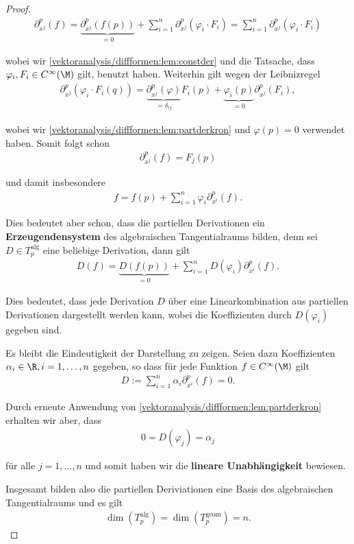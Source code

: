 \documentclass[letterpaper,10pt,english]{jupyterBook}
\begin{document}
\begin{proof}
\begin{align*}
\partial_{x^j}^p (f) = 
\underbrace{\partial_{x^j}^p (f(p))}_{=0} + 
\sum_{i=1}^{n} \partial_{x^j}^p(\varphi_i \cdot F_i) = 
\sum_{i=1}^{n} \partial_{x^j}^p(\varphi_i \cdot F_i)
\end{align*}
\par
wobei wir \cref{vektoranalysis/diffformen:lem:constder} und die Tatsache, dass \(\varphi_i, F_i\in C^\infty(\M)\) gilt, benutzt haben.
Weiterhin gilt wegen der Leibnizregel
\begin{align*}
\partial_{x^j}^p(\varphi_i \cdot F_i(q)) = 
\underbrace{\partial_{x^j}^p(\varphi)}_{=\delta_{ij}} F_i(p)+ \underbrace{\varphi_i(p)}_{=0} \partial_{x^j}^p(F_i),
\end{align*}
\par
wobei wir \cref{vektoranalysis/diffformen:lem:partderkron} und \(\varphi(p)=0\) verwendet haben.
Somit folgt schon
\begin{align*}
\partial_{x^j}^p (f) = F_j(p)
\end{align*}
\par
und damit insbesondere
\begin{align*}
f = f(p) + \sum_{i=1}^{n} \varphi_i \partial_{x^i}^p(f).
\end{align*}
\par
Dies bedeutet aber schon, dass die partiellen Derivationen ein \textbf{Erzeugendensystem} des algebraischen Tangentialraums bilden, denn sei \(D\in T^{\text{alg}}_p\) eine beliebige Derivation, dann gilt
\begin{align*}
D(f) = \underbrace{D(f(p))}_{=0} + \sum_{i=1}^n D(\varphi_i) \partial_{x^i}^p(f).
\end{align*}
\par
Dies bedeutet, dass jede Derivation \(D\) über eine Linearkombination aus partiellen Derivationen dargestellt werden kann, wobei die Koeffizienten durch \(D(\varphi_i)\) gegeben sind.

\par
Es bleibt die Eindeutigkeit der Darstellung zu zeigen.
Seien dazu Koeffizienten \(\alpha_i \in \R, i=1,\ldots,n\) gegeben, so dass für jede Funktion \(f\in C^\infty(\M)\) gilt
\begin{align*}
D:= \sum_{i=1}^n \alpha_i \partial_{x^i}^p(f) = 0.
\end{align*}
\par
Durch erneute Anwendung von \cref{vektoranalysis/diffformen:lem:partderkron} erhalten wir aber, dass
\begin{align*}
0 = D(\varphi_j) = \alpha_j\end{align*}
\par
für alle \(j=1,\ldots,n\) und somit haben wir die \textbf{lineare Unabhängigkeit} bewiesen.

\par
Insgesamt bilden also die partiellen Deriviationen eine Basis des algebraischen Tangentialraums und es gilt
\begin{align*}
\dim(T^{\text{alg}}_p)=\dim(T^{\text{geom}}_p)=n.
\end{align*}\end{proof}
\end{document}
